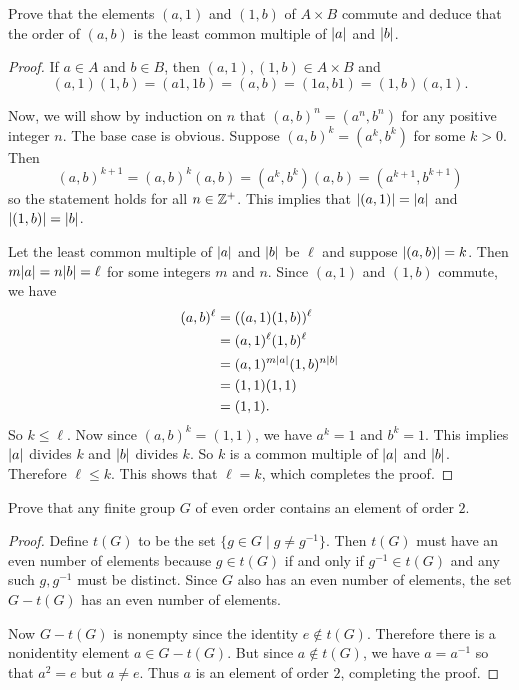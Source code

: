  Prove that the elements $(a,1)$ and $(1,b)$ of
$A\times B$ commute and deduce that the order of $(a,b)$ is the least
common multiple of $\lvert{a}\rvert$ and $\lvert{b}\rvert$.
\begin{proof}
  If $a\in A$ and $b\in B$, then $(a,1),(1,b)\in A\times B$ and
  \begin{equation*}
    (a,1)(1,b) = (a1,1b) = (a,b) = (1a,b1) = (1,b)(a,1).
  \end{equation*}

  Now, we will show by induction on $n$ that $(a,b)^n = (a^n,b^n)$ for
  any positive integer $n$. The base case is obvious. Suppose
  $(a,b)^k = (a^k,b^k)$ for some $k>0$. Then
  \begin{equation*}
    (a,b)^{k+1} = (a,b)^k(a,b)
    = (a^k,b^k)(a,b) = (a^{k+1},b^{k+1})
  \end{equation*}
  so the statement holds for all $n\in\mathbb{Z}^+$. This implies that
  $\lvert{(a,1)}\rvert = \lvert{a}\rvert$ and $\lvert{(1,b)}\rvert = \lvert{b}\rvert$.

  Let the least common multiple of $\lvert{a}\rvert$ and $\lvert{b}\rvert$ be $\ell$
  and suppose $\lvert{(a,b)}\rvert = k$. Then $m\lvert{a}\rvert = n\lvert{b}\rvert = \ell$ for
  some integers $m$ and $n$. Since $(a,1)$ and $(1,b)$ commute, we
  have
  \begin{align*}
    (a,b)^\ell
    &= ((a,1)(1,b))^\ell \\
    &= (a,1)^\ell(1,b)^\ell \\
    &= (a,1)^{m\lvert{a}\rvert}(1,b)^{n\lvert{b}\rvert} \\
    &= (1,1)(1,1) \\
    &= (1,1).
  \end{align*}
  So $k\leq\ell$. Now since $(a,b)^k = (1,1)$, we have $a^k = 1$ and
  $b^k = 1$. This implies $\lvert{a}\rvert$ divides $k$ and $\lvert{b}\rvert$ divides
  $k$. So $k$ is a common multiple of $\lvert{a}\rvert$ and
  $\lvert{b}\rvert$. Therefore $\ell\leq k$. This shows that $\ell = k$, which
  completes the proof.
\end{proof}

 Prove that any finite group $G$ of even order contains
an element of order $2$.
\begin{proof}
  Define $t(G)$ to be the set $\{ g \in G \mid g \neq g^{-1} \}$. Then
  $t(G)$ must have an even number of elements because $g\in t(G)$ if
  and only if $g^{-1}\in t(G)$ and any such $g, g^{-1}$ must be
  distinct. Since $G$ also has an even number of elements, the set
  $G-t(G)$ has an even number of elements.

  Now $G-t(G)$ is nonempty since the identity $e\not\in
  t(G)$. Therefore there is a nonidentity element $a\in G - t(G)$. But
  since $a\not\in t(G)$, we have $a = a^{-1}$ so that $a^2 = e$ but
  $a\neq e$. Thus $a$ is an element of order $2$, completing the
  proof.
\end{proof}

